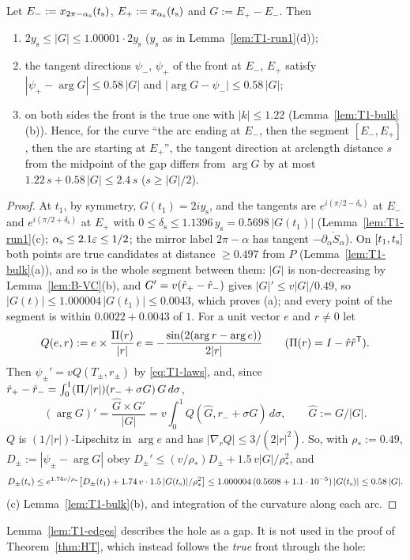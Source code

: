 \begin{lemma}\label{lem:T1-edges}
Let $E_-:=x_{2\pi-\alpha_{\mathrm s}}(t_{\mathrm s})$, $E_+:=x_{\alpha_{\mathrm s}}(t_{\mathrm s})$ and $G:=E_+-E_-$. Then
\begin{enumerate}
\item[(a)] $2y_{\mathrm s}\le|G|\le1.00001\cdot2y_{\mathrm s}$ ($y_{\mathrm s}$ as in Lemma~\ref{lem:T1-run1}(d));
\item[(b)] the tangent directions $\psi_-$, $\psi_+$ of the front at $E_-$, $E_+$ satisfy $|\psi_+-\arg G|\le0.58\,|G|$ and
$|\arg G-\psi_-|\le0.58\,|G|$;
\item[(c)] on both sides the front is the true one with $|k|\le1.22$ (Lemma~\ref{lem:T1-bulk}(b)). Hence, for the curve ``the arc
ending at $E_-$, then the segment $[E_-,E_+]$, then the arc starting at $E_+$'', the tangent direction at arclength distance $s$ from
the midpoint of the gap differs from $\arg G$ by at most $1.22\,s+0.58\,|G|\le2.4\,s$ ($s\ge|G|/2$).
\end{enumerate}
\end{lemma}
\begin{proof}
At $t_1$, by symmetry, $G(t_1)=2iy_{\mathrm s}$, and the tangents are $e^{i(\pi/2-\delta_{\mathrm s})}$ at $E_-$ and
$e^{i(\pi/2+\delta_{\mathrm s})}$ at $E_+$ with $0\le\delta_{\mathrm s}\le1.1396\,y_{\mathrm s}=0.5698\,|G(t_1)|$
(Lemma~\ref{lem:T1-run1}(c); $\alpha_{\mathrm s}\le2.1\varepsilon\le1/2$; the mirror label $2\pi-\alpha$ has tangent
$-\overline{\partial_\alpha S_\alpha}$). On $[t_1,t_{\mathrm s}]$ both points are true candidates at distance $\ge0.497$ from $P$
(Lemma~\ref{lem:T1-bulk}(a)), and so is the whole segment between them: $|G|$ is non-decreasing by Lemma~\ref{lem:B-VC}(b), and
$G'=v(\hat r_+-\hat r_-)$ gives $|G|'\le v|G|/0.49$, so $|G(t)|\le1.000004\,|G(t_1)|\le0.0043$, which proves (a); and every point of the
segment is within $0.0022+0.0043$ of $1$. For a unit vector $e$ and $r\ne0$ let
\[
Q(e,r):=e\times\frac{\Pi(r)}{|r|}\,e=-\frac{\sin(2(\arg r-\arg e))}{2|r|}\qquad(\Pi(r)=I-\hat r\hat r^{\mathsf T}).
\]
Then $\psi_\pm'=vQ(T_\pm,r_\pm)$ by \eqref{eq:T1-laws}, and, since $\hat r_+-\hat r_-=\int_0^1(\Pi/|r|)(r_-+\sigma G)\,G\,d\sigma$,
\[
(\arg G)'=\frac{\hat G\times G'}{|G|}=v\int_0^1Q(\hat G,r_-+\sigma G)\,d\sigma,\qquad\hat G:=G/|G| .
\]
$Q$ is $(1/|r|)$-Lipschitz in $\arg e$ and has $|\nabla_rQ|\le3/(2|r|^2)$. So, with $\rho_*:=0.49$,
$D_\pm:=|\psi_\pm-\arg G|$ obey $D_\pm'\le(v/\rho_*)D_\pm+1.5\,v|G|/\rho_*^2$, and
\[
D_\pm(t_{\mathrm s})\le e^{1.74v/\rho_*}\bigl[D_\pm(t_1)+1.74\,v\cdot1.5\,|G(t_{\mathrm s})|/\rho_*^2\bigr]\le1.000004\,(0.5698+1.1\cdot10^{-5})\,|G(t_{\mathrm s})|\le0.58\,|G| .
\]
(c) Lemma~\ref{lem:T1-bulk}(b), and integration of the curvature along each arc.
\end{proof}
Lemma~\ref{lem:T1-edges} describes the hole as a gap. It is not used in the proof of Theorem~\ref{thm:HT}, which instead follows the
\emph{true} front through the hole:

